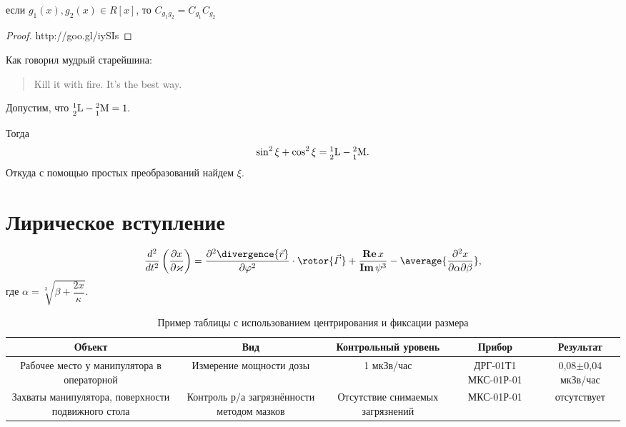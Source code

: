 \documentclass[pscyr,titlepage]{hedreport}
\begin{document}
	\begin{lemma}
		если \( g_1(x), g_2(x) \in R[x] \),
		то \( C_{g_1g_2} = C_{g_1} C_{g_2} \)
	\end{lemma}
	
	\begin{proof}
		http://goo.gl/iySIs
	\end{proof}
	
	Как говорил мудрый старейшина:
	\begin{quotation}
		Kill it with fire. It's the best way.
	\end{quotation}
	
	\begin{solution}
		Допустим, что \( \nucleus{1}{2}{L} - \nucleus{2}{1}{M} = 1. \)
		
		Тогда
		\[
			\sin^2\xi + \cos^2\xi = 
			\nucleus{1}{2}{L} - \nucleus{2}{1}{M}.
		\]		
		Откуда с помощью простых преобразований найдем \( \xi \).
	\end{solution}
	
	\section{Лирическое вступление}
	\[
		\dder{}{t}\left( \pder{x}{\kappa} \right) =
			\ppder{\divergence{\vec{r}}}{\phi}\cdot\rotor{\vec\Gamma} +
			\frac{\Re{x}}{\Im{\psi^3}} - \average{\pcder{x}{\alpha}{\beta}},
	\]
	где \( \alpha = \sqrt[3]{\beta + \dfrac{2x}{\kappa}} \).
	\begin{comment}
		При использовании пакета опции {\tt root} пакета {\tt{hedmaths}} у корня
		появится закрывающая черта:
		\[
			\Delta\sigma = \sqrt{\left( \pder{\sigma}{J}\Delta J \right)^2 +
			\left( \pder{\sigma}{U}\Delta U \right)^2 +
			\left( \pder{\sigma}{T}\Delta T \right)^2 +
			\left( \pder{\sigma}{T_0}\Delta T_0 \right)^2}.
		\]
	\end{comment}
	\begin{table}[ht]
		\centering
		\caption{Пример таблицы с использованием центрирования
			и фиксации размера}
		\begin{tabular}{|C{.2}|C{.2}|C{.17}|C{.18}|C{.15}|}
			\hline
			Объект & Вид & Контрольный уровень & Прибор & Результат \\ \hline
			Рабочее место у манипулятора в операторной
			& Измерение мощности дозы
			& 1 мкЗв/час & ДРГ-01Т1 МКС-01Р-01
			& 0,08\( \pm \)0,04 мкЗв/час \\ \hline
			Захваты манипулятора, поверхности подвижного стола
			& Контроль р/а загрязнённости методом мазков
			& Отсутствие снимаемых загрязнений
			& МКС-01Р-01 & отсутствует \\ \hline
		\end{tabular}
	\end{table}
\end{document}
